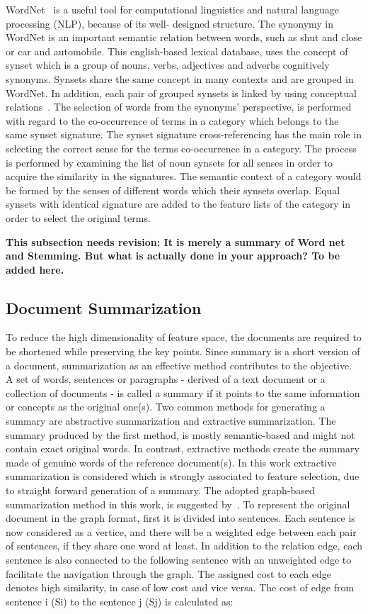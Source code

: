 \documentclass{sigchi}
\begin{document}
WordNet~\cite{miller1990introduction} is a useful tool for computational linguistics and natural language processing (NLP), because of its well-
designed structure. 
The synonymy in WordNet is an important semantic relation between words, such as shut and close or car and automobile. 
This english-based lexical database, uses the concept of synset which is a group of nouns, verbs, adjectives and adverbs cognitively synonyms.
Synsets share the same concept in many contexts and are grouped in WordNet.
In addition, each pair of grouped synsets is linked by using conceptual relations~\cite{1410799}. 
The selection of words from the synonyms’ perspective, is performed with regard to the co-occurrence of terms in a category which belongs to the same synset signature. 
The synset signature cross-referencing has the main role in selecting the correct sense for the terms co-occurrence in a category. The process is performed by examining the list of noun synsets for all senses in order to acquire the similarity in the signatures. 
The semantic context of a category would be formed by the senses of different words which their synsets overlap.
Equal synsets with identical signature are added to the feature lists of the category in order to select the original terms.

\textbf{This subsection needs revision: It is merely a summary of Word net and Stemming. But what is actually done in your approach? To be added here.}

\subsection{Document Summarization}\label{sectionSummarization}
To reduce the high dimensionality of feature space, the documents are required to be shortened while preserving the key points. 
Since summary is a short version of a document, summarization as an effective method contributes to the objective.
A set of words, sentences or paragraphs - derived of a text document or a collection of documents - is called a summary if it points to the same information or concepts as the original one(s). 
Two common methods for generating a summary are abstractive summarization and extractive summarization. 
The summary produced by the first method, is mostly semantic-based and might not contain exact original words. 
In contrast, extractive methods create the summary made of genuine words of the reference document(s). 
In this work extractive summarization is considered which is strongly associated to feature selection, due to straight forward generation of a
summary.
The adopted graph-based summarization method in this work, is suggested by~\cite{sjobergh2006extraction}. 
To represent the original document in the graph format, first it is divided into sentences. 
Each sentence is now considered as a vertice, and there will be a weighted edge between each pair of sentences, if they share one word at least.
In addition to the relation edge, each sentence is also connected to the following sentence with an unweighted edge to facilitate the navigation through the graph.
The assigned cost to each edge denotes high similarity, in case of low cost and vice versa. 
The cost of edge from sentence i (Si) to the sentence j (Sj) is calculated as:
\end{document}
